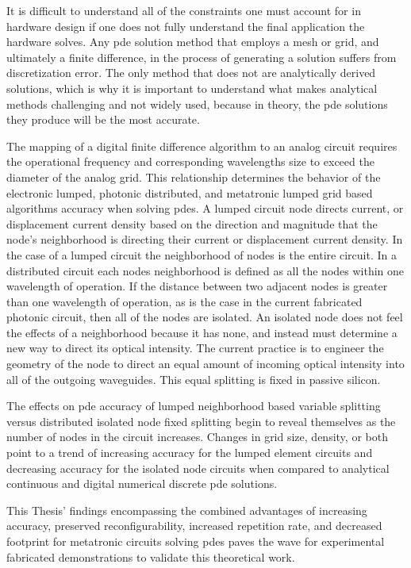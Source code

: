 \par It is difficult to understand all of the constraints one must account for in hardware design if one does not fully understand the final application the hardware solves. Any \acrshort{pde} solution method that employs a mesh or grid, and ultimately a finite difference, in the process of generating a solution suffers from discretization error. The only method that does not are analytically derived solutions, which is why it is important to understand what makes analytical methods challenging and not widely used, because in theory, the \acrshort{pde} solutions they produce will be the most accurate.

\par The mapping of a digital finite difference algorithm to an analog circuit requires the operational frequency and corresponding wavelengths size to exceed the diameter of the analog grid. This relationship determines the behavior of the electronic lumped, photonic distributed, and metatronic lumped grid based algorithms accuracy when solving \acrshort{pde}s. A lumped circuit node directs current, or displacement current density based on the direction and magnitude that the node's neighborhood is directing their current or displacement current density. In the case of a lumped circuit the neighborhood of nodes is the entire circuit. In a distributed circuit each nodes neighborhood is defined as all the nodes within one wavelength of operation. If the distance between two adjacent nodes is greater than one wavelength of operation, as is the case in the current fabricated photonic circuit, then all of the nodes are isolated. An isolated node does not feel the effects of a neighborhood because it has none, and instead must determine a new way to direct its optical intensity. The current practice is to engineer the geometry of the node to direct an equal amount of incoming optical intensity into all of the outgoing waveguides. This equal splitting is fixed in passive silicon.

\Par The effects on \acrshort{pde} accuracy of lumped neighborhood based variable splitting versus distributed isolated node fixed splitting begin to reveal themselves as the number of nodes in the circuit increases. Changes in grid size, density, or both point to a trend of increasing accuracy for the lumped element circuits and decreasing accuracy for the isolated node circuits when compared to analytical continuous and digital numerical discrete pde solutions.

\par This Thesis' findings encompassing the combined advantages of increasing accuracy, preserved reconfigurability, increased repetition rate, and decreased footprint for metatronic circuits solving \acrlong{pde}s paves the wave for experimental fabricated demonstrations to validate this theoretical work.

\clearpage
